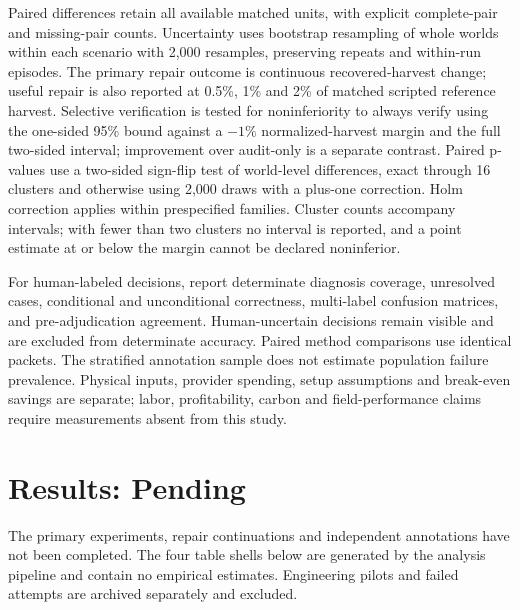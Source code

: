 \documentclass[sigconf,anonymous]{aamas}
\begin{document}
Paired differences retain all available matched units, with explicit complete-pair and missing-pair counts. Uncertainty uses bootstrap resampling of whole worlds within each scenario with 2,000 resamples, preserving repeats and within-run episodes. The primary repair outcome is continuous recovered-harvest change; useful repair is also reported at 0.5\%, 1\% and 2\% of matched scripted reference harvest. Selective verification is tested for noninferiority to always verify using the one-sided 95\% bound against a $-1\%$ normalized-harvest margin and the full two-sided interval; improvement over audit-only is a separate contrast. Paired p-values use a two-sided sign-flip test of world-level differences, exact through 16 clusters and otherwise using 2,000 draws with a plus-one correction. Holm correction applies within prespecified families. Cluster counts accompany intervals; with fewer than two clusters no interval is reported, and a point estimate at or below the margin cannot be declared noninferior.

For human-labeled decisions, report determinate diagnosis coverage, unresolved cases, conditional and unconditional correctness, multi-label confusion matrices, and pre-adjudication agreement. Human-uncertain decisions remain visible and are excluded from determinate accuracy. Paired method comparisons use identical packets. The stratified annotation sample does not estimate population failure prevalence. Physical inputs, provider spending, setup assumptions and break-even savings are separate; labor, profitability, carbon and field-performance claims require measurements absent from this study.

\section{Results: Pending}
The primary experiments, repair continuations and independent annotations have not been completed. The four table shells below are generated by the analysis pipeline and contain no empirical estimates. Engineering pilots and failed attempts are archived separately and excluded.
\begin{table}[t]
\centering
\caption{Evaluation disagreement.}
\resizebox{\columnwidth}{!}{}
\end{table}
\begin{table}[t]
\centering
\caption{Failure diagnosis against independent labels.}
\resizebox{\columnwidth}{!}{}
\end{table}
\begin{table}[t]
\centering
\caption{Matched native repair continuations.}
\resizebox{\columnwidth}{!}{}
\end{table}
\begin{table}[t]
\centering
\caption{Selective live verification.}
\resizebox{\columnwidth}{!}{}
\end{table}
\end{document}
